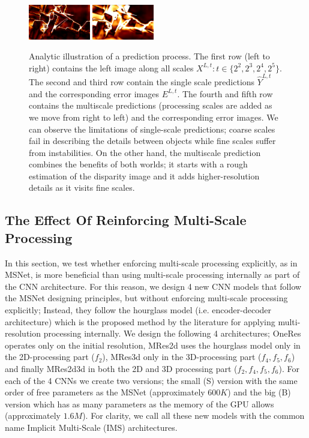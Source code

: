 \documentclass[runningheads]{llncs}
\begin{document}
\begin{figure}
\begin{center}
        \includegraphics[width=0.24\textwidth,height=0.1\textwidth,clip]{figures/pred_comb_2_err.png}
        \includegraphics[width=0.24\textwidth,height=0.1\textwidth,clip]{figures/pred_comb_3_err.png}
    \end{center}
    \caption{Analytic illustration of a prediction process. The first row (left to right) contains the left image along all scales $X^{L,t} : t \in \{2^2, 2^3, 2^4, 2^5\}$. The second and third row contain the single scale predictions $\hat{Y}^{L,t}$ and the corresponding error images $E^{L,t}$. The fourth and fifth row contains the multiscale predictions (processing scales are added as we move from right to left) and the corresponding error images. We can observe the limitations of single-scale predictions; coarse scales fail in describing the details between objects while fine scales suffer from instabilities. On the other hand, the multiscale prediction combines the benefits of both worlds; it starts with a rough estimation of the disparity image and it adds higher-resolution details as it visits fine scales.}
    \label{fig:EMAPs}
\end{figure}

\subsection{The Effect Of Reinforcing Multi-Scale Processing}

In this section, we test whether enforcing multi-scale processing explicitly, as in MSNet, is more beneficial than using multi-scale processing internally as part of the CNN architecture. For this reason, we design 4 new CNN models that follow the MSNet designing principles, but without enforcing multi-scale processing explicitly; Instead, they follow the hourglass model (i.e. encoder-decoder architecture) which is the proposed method by the literature for applying multi-resolution processing internally. We design the following 4 architectures; OneRes operates only on the initial resolution, MRes2d uses the hourglass model only in the 2D-processing part ($f_2$), MRes3d only in the 3D-processing part ($f_4, f_5, f_6$) and finally MRes2d3d in both the 2D and 3D processing part ($f_2, f_4, f_5, f_6$). For each of the 4 CNNs we create two versions; the small (S) version with the same order of free parameters as the MSNet (approximately $600K$) and the big (B) version which has as many parameters as the memory of the GPU allows (approximately $1.6M$). For clarity, we call all these new models with the common name Implicit Multi-Scale (IMS) architectures.
\end{document}
